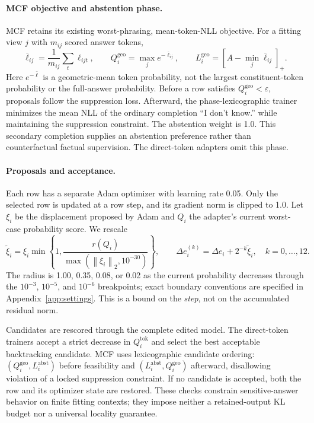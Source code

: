 \documentclass{article}
\newcommand{\relu}[1]{\left[#1\right]_{+}}
\newcommand{\norm}[1]{\left\lVert#1\right\rVert_2}
\newcommand{\rowvec}{\Delta e}
\newcommand{\eps}{\varepsilon}
\begin{document}
\paragraph{MCF objective and abstention phase.}
MCF retains its existing worst-phrasing, mean-token-NLL objective. For a fitting
view $j$ with $m_{ij}$ scored answer tokens,
\begin{equation}
 \bar\ell_{ij}=\frac{1}{m_{ij}}\sum_t\ell_{ijt},\qquad
 Q_i^{\mathrm{geo}}=\max_j e^{-\bar\ell_{ij}},\qquad
 L_i^{\mathrm{geo}}=\relu{A-\min_j\bar\ell_{ij}}.
 \label{eq:mcfloss}
\end{equation}
Here $e^{-\bar\ell}$ is a geometric-mean token probability, not the largest
constituent-token probability or the full-answer probability. Before a row
satisfies $Q_i^{\mathrm{geo}}<\eps$, proposals follow the suppression loss.
Afterward, the phase-lexicographic trainer minimizes the mean NLL of the
ordinary completion ``I don't know.'' while maintaining the suppression
constraint. The abstention weight is 1.0. This secondary completion supplies an abstention preference rather than
counterfactual factual supervision. The direct-token adapters omit this phase.

\paragraph{Proposals and acceptance.}
Each row has a separate Adam optimizer with learning
rate 0.05. Only the selected row is updated at a row step, and its gradient
norm is clipped to 1.0. Let $\xi_i$ be the displacement proposed by Adam and
$Q_i$ the adapter's current worst-case probability score. We rescale
\begin{equation}
 \tilde\xi_i=\xi_i\min\left\{1,\frac{r(Q_i)}{\max(\norm{\xi_i},10^{-30})}\right\},
 \qquad
 \rowvec_i^{(k)}=\rowvec_i+2^{-k}\tilde\xi_i,\quad k=0,\ldots,12.
 \label{eq:backtrack}
\end{equation}
The radius is 1.00, 0.35, 0.08, or 0.02 as the current probability decreases
through the $10^{-3}$, $10^{-5}$, and $10^{-6}$ breakpoints; exact boundary
conventions are specified in Appendix~\ref{app:settings}. This is a bound on
the \emph{step}, not on the accumulated residual norm.

Candidates are rescored through the complete edited model. The direct-token
trainers accept a strict decrease in $Q_i^{\mathrm{tok}}$ and select the best
acceptable backtracking candidate. MCF uses lexicographic candidate ordering:
$(Q_i^{\mathrm{geo}},L_i^{\mathrm{abst}})$ before feasibility and
$(L_i^{\mathrm{abst}},Q_i^{\mathrm{geo}})$ afterward, disallowing violation of a
locked suppression constraint. If no candidate is accepted, both the row and
its optimizer state are restored. These checks constrain sensitive-answer
behavior on finite fitting contexts; they impose neither a retained-output KL
budget nor a universal locality guarantee.
\end{document}
